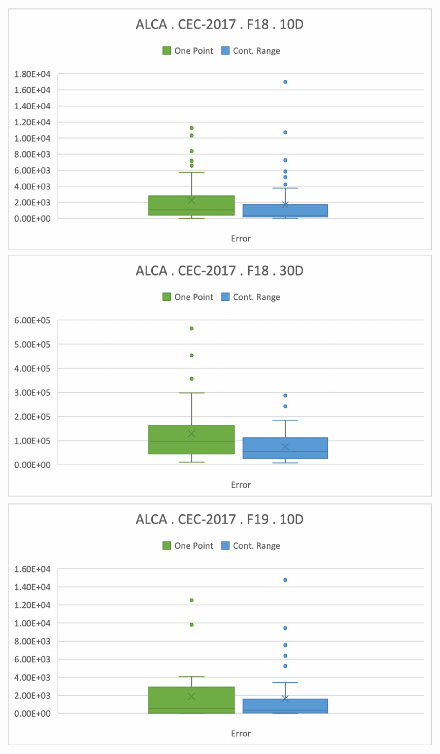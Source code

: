 \documentclass[graybox]{svmult}
\begin{document}
\begin{figure}[!ht]
\begin{minipage}[h]{0.49\linewidth}
        \end{minipage}
        \vfill
        \vspace{0.05 cm}
        \begin{minipage}[h]{0.49\linewidth}
            \includegraphics[width=1\linewidth]{img/fig_experiment_F18x10D.pdf} 
        \end{minipage}
        \hfill
        \begin{minipage}[h]{0.49\linewidth}
            \includegraphics[width=1\linewidth]{img/fig_experiment_F18x30D.pdf} 
        \end{minipage}
        \vfill
        \vspace{0.05 cm}
        \begin{minipage}[h]{0.49\linewidth}
            \includegraphics[width=1\linewidth]{img/fig_experiment_F19x10D.pdf} 

\end{minipage}
\end{figure}
\end{document}
